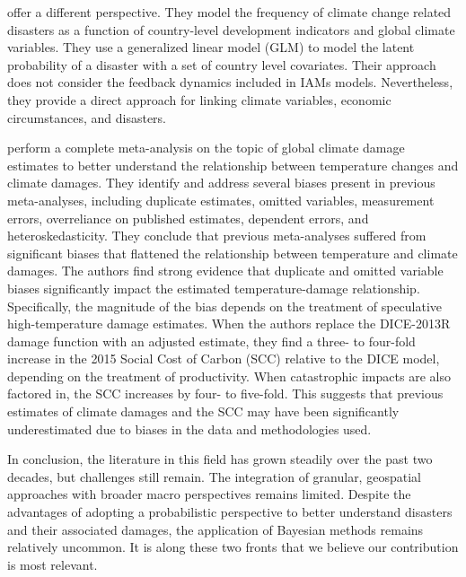 \citet{lopez_climate_2015} offer a different perspective. They model the frequency of climate change related disasters as a function of country-level development indicators and global climate variables. They use a generalized linear model (GLM) to model the latent probability of a disaster with a set of country level covariates. Their approach does not consider the feedback dynamics included in IAMs models. Nevertheless, they provide a direct approach for linking climate variables, economic circumstances, and disasters.

\citet{Howard2017} perform a complete meta-analysis on the topic of global climate damage estimates to better understand the relationship between temperature changes and climate damages. They identify and address several biases present in previous meta-analyses, including duplicate estimates, omitted variables, measurement errors, overreliance on published estimates, dependent errors, and heteroskedasticity. They conclude that previous meta-analyses suffered from significant biases that flattened the relationship between temperature and climate damages. The authors find strong evidence that duplicate and omitted variable biases significantly impact the estimated temperature-damage relationship. Specifically, the magnitude of the bias depends on the treatment of speculative high-temperature damage estimates. When the authors replace the DICE-2013R damage function with an adjusted estimate, they find a three- to four-fold increase in the 2015 Social Cost of Carbon (SCC) relative to the DICE model, depending on the treatment of productivity. When catastrophic impacts are also factored in, the SCC increases by four- to five-fold. This suggests that previous estimates of climate damages and the SCC may have been significantly underestimated due to biases in the data and methodologies used.

In conclusion, the literature in this field has grown steadily over the past two decades, but challenges still remain. The integration of granular, geospatial approaches with broader macro perspectives remains limited. Despite the advantages of adopting a probabilistic perspective to better understand disasters and their associated damages, the application of Bayesian methods remains relatively uncommon. It is along these two fronts that we believe our contribution is most relevant.
